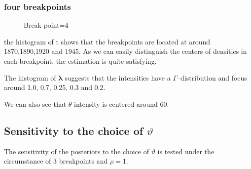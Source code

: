 \documentclass{article}
\begin{document}
\subsubsection{four breakpoints}
\begin{figure}[H]
    \centering
    \caption{Break point=4}
\end{figure}

the histogram of t shows that the breakpoints are located at around 1870,1890,1920 and 1945. As we can easily distinguish the centers of densities in each breakpoint, the estimation is quite satisfying.

The histogram of $\boldsymbol{\lambda}$ suggests that the intensities have a $\Gamma$–distribution and focus around 1.0, 0.7, 0.25, 0.3 and 0.2.

We can also see that $\theta$ intensity is centered around 60.

\subsection{Sensitivity to the choice of $\vartheta$}
The sensitivity of the posteriors to the choice of $\vartheta$ is tested under the circumstance of 3 breakpoints and $\rho=1$.
\end{document}
